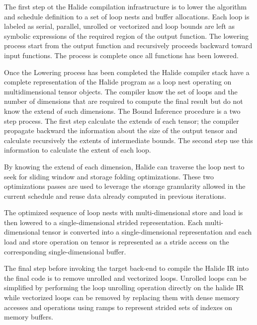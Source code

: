 \documentclass[../main.tex]{subfiles}
\begin{document}
The first step ot the Halide compilation infrastructure is to lower the algorithm and schedule definition to a set of loop nests and buffer allocations. Each loop is labeled as serial, parallel, unrolled or vectorized and loop bounds are left as symbolic expressions of the required region of the output function.
The lowering process start from the output function and recursively proceeds backward toward input functions. 
The process is complete once all functions has been lowered.

Once the Lowering process has been completed the Halide compiler stack have a complete representation of the Halide program as a loop nest operating on multidimensional tensor objects. The compiler know the set of loops and the number of dimensions that are required to compute the final result but do not know the extend of such dimensions.
The Bound Inference procedure is a two step process. The first step calculate the extends of each tensor; the compiler propagate backward the information about the size of the output tensor and calculate recursively the extents of intermediate bounds. The second step use this information to calculate the extent of each loop.

By knowing the extend of each dimension, Halide can traverse the loop nest to seek for sliding window and storage folding optimizations. These two optimizations passes are used to leverage the storage granularity allowed in the current schedule and reuse data already computed in previous iterations.

The optimized sequence of loop nests with multi-dimensional store and load is then lowered to a single-dimensional strided representation. Each multi-dimensional tensor is converted into a single-dimensional representation and each load and store operation on tensor is represented as a stride access on the corresponding single-dimensional buffer.

The final step before invoking the target back-end to compile the Halide IR into the final code is to remove unrolled and vectorized loops. 
Unrolled loops can be simplified by performing the loop unrolling operation directly on the halide IR while vectorized loops can be removed by replacing them with dense memory accesses and operations using ramps to represent strided sets of indexes on memory buffers.
\end{document}
